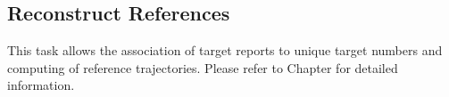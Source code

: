 \subsection{Reconstruct References}
\label{sec:ui_proc_reconst_references}

This task allows the association of target reports to unique target numbers and computing of reference trajectories. 
Please refer to Chapter  for detailed information.
